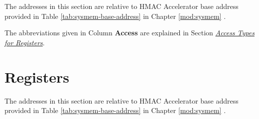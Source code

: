 \documentclass[main\_\_EN.tex]{subfiles}
\begin{document}
The addresses in this section are relative to HMAC Accelerator base address provided in Table \ref{tab:sysmem-base-address} in Chapter \ref{mod:sysmem} \textit{}.

The abbreviations given in Column \textbf{Access} are explained in Section \hyperref[glossary-access-types]{\textit{Access Types for Registers}}.







\clearpage
\section{Registers}

The addresses in this section are relative to HMAC Accelerator base address provided in Table \ref{tab:sysmem-base-address} in Chapter \ref{mod:sysmem} \textit{}.


\end{document}
